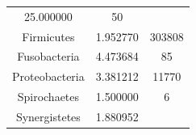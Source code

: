 \documentclass[12pt,twoside]{dukestatscithesis}
\begin{document}
\begin{longtable}[]{@{}ccc@{}}
\begin{minipage}[t]{0.28\columnwidth}
25.000000\strut
\end{minipage} & \begin{minipage}[t]{0.28\columnwidth}\centering\strut
50\strut
\end{minipage}\tabularnewline
\begin{minipage}[t]{0.35\columnwidth}\centering\strut
Firmicutes\strut
\end{minipage} & \begin{minipage}[t]{0.28\columnwidth}\centering\strut
1.952770\strut
\end{minipage} & \begin{minipage}[t]{0.28\columnwidth}\centering\strut
303808\strut
\end{minipage}\tabularnewline
\begin{minipage}[t]{0.35\columnwidth}\centering\strut
Fusobacteria\strut
\end{minipage} & \begin{minipage}[t]{0.28\columnwidth}\centering\strut
4.473684\strut
\end{minipage} & \begin{minipage}[t]{0.28\columnwidth}\centering\strut
85\strut
\end{minipage}\tabularnewline
\begin{minipage}[t]{0.35\columnwidth}\centering\strut
Proteobacteria\strut
\end{minipage} & \begin{minipage}[t]{0.28\columnwidth}\centering\strut
3.381212\strut
\end{minipage} & \begin{minipage}[t]{0.28\columnwidth}\centering\strut
11770\strut
\end{minipage}\tabularnewline
\begin{minipage}[t]{0.35\columnwidth}\centering\strut
Spirochaetes\strut
\end{minipage} & \begin{minipage}[t]{0.28\columnwidth}\centering\strut
1.500000\strut
\end{minipage} & \begin{minipage}[t]{0.28\columnwidth}\centering\strut
6\strut
\end{minipage}\tabularnewline
\begin{minipage}[t]{0.35\columnwidth}\centering\strut
Synergistetes\strut
\end{minipage} & \begin{minipage}[t]{0.28\columnwidth}\centering\strut
1.880952\strut
\end{minipage} & \begin{minipage}[t]{0.28\columnwidth}\centering\strut

\end{minipage}
\end{longtable}
\end{document}

